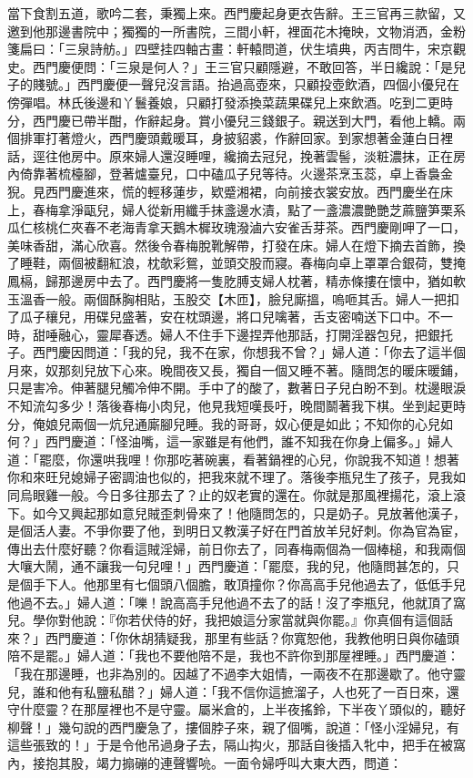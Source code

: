 當下食割五道，歌吟二套，秉獨上來。西門慶起身更衣告辭。王三官再三款留，又邀到他那邊書院中；獨獨的一所書院，三間小軒，裡面花木掩映，文物消洒，金粉箋扁曰：「三泉詩舫。」四壁挂四軸古畫：軒轅問道，伏生墳典，丙吉問牛，宋京觀史。西門慶便問：「三泉是何人？」王三官只顧隱避，不敢回答，半日纔說：「是兒子的賤號。」西門慶便一聲兒沒言語。抬過高壺來，只顧投壺飲酒，四個小優兒在傍彈唱。林氏後邊和丫鬟養娘，只顧打發添換菜蔬果碟兒上來飲酒。吃到二更時分，西門慶已帶半酣，作辭起身。賞小優兒三錢銀子。親送到大門，看他上轎。兩個排軍打著燈火，西門慶頭戴暖耳，身披貂裘，作辭回家。到家想著金蓮白日裡話，逕往他房中。原來婦人還沒睡哩，纔摘去冠兒，挽著雲髻，淡粧濃抹，正在房內倚靠著梳檯腳，登著爐臺兒，口中磕瓜子兒等待。火邊茶烹玉蕊，卓上香裊金猊。見西門慶進來，慌的輕移蓮步，欵蹙湘裙，向前接衣裳安放。西門慶坐在床上，春梅拿淨甌兒，婦人從新用纖手抹盞邊水漬，點了一盞濃濃艷艷芝蔴鹽笋栗系瓜仁核桃仁夾春不老海青拿天鵝木樨玫瑰潑滷六安雀舌芽茶。西門慶剛呷了一口，美味香甜，滿心欣喜。然後令春梅脫靴解帶，打發在床。婦人在燈下摘去首飾，換了睡鞋，兩個被翻紅浪，枕欹彩鴛，並頭交股而寢。春梅向卓上罩罩合銀荷，雙掩鳳槅，歸那邊房中去了。西門慶將一隻肐膊支婦人枕著，精赤條摟在懷中，猶如軟玉溫香一般。兩個酥胸相貼，玉股交【木匝】，臉兒廝搵，嗚咂其舌。婦人一把扣了瓜子穰兒，用碟兒盛著，安在枕頭邊，將口兒噙著，舌支密喃送下口中。不一時，甜唾融心，靈犀春透。婦人不住手下邊捏弄他那話，打開淫器包兒，把銀托子。西門慶因問道：「我的兒，我不在家，你想我不曾？」婦人道：「你去了這半個月來，奴那刻兒放下心來。晚間夜又長，獨自一個又睡不著。隨問怎的暖床暖鋪，只是害冷。伸著腿兒觸冷伸不開。手中了的酸了，數著日子兒白盼不到。枕邊眼淚不知流勾多少！落後春梅小肉兒，他見我短嘆長吁，晚間鬬著我下棋。坐到起更時分，俺娘兒兩個一炕兒通廝腳兒睡。我的哥哥，奴心便是如此；不知你的心兒如何？」西門慶道：「怪油嘴，這一家雖是有他們，誰不知我在你身上偏多。」婦人道：「罷麼，你還哄我哩！你那吃著碗裏，看著鍋裡的心兒，你說我不知道！想著你和來旺兒媳婦子密調油也似的，把我來就不理了。落後李瓶兒生了孩子，見我如同烏眼雞一般。今日多往那去了？止的奴老實的還在。你就是那風裡揚花，滾上滾下。如今又興起那如意兒賊歪刺骨來了！他隨問怎的，只是奶子。見放著他漢子，是個活人妻。不爭你要了他，到明日又教漢子好在門首放羊兒好刺。你為官為宦，傳出去什麼好聽？你看這賊淫婦，前日你去了，同春梅兩個為一個棒槌，和我兩個大嚷大鬧，通不讓我一句兒哩！」西門慶道：「罷麼，我的兒，他隨問甚怎的，只是個手下人。他那里有七個頭八個膽，敢頂撞你？你高高手兒他過去了，低低手兒他過不去。」婦人道：「嚛！說高高手兒他過不去了的話！沒了李瓶兒，他就頂了窩兒。學你對他說：『你若伏侍的好，我把娘這分家當就與你罷。』你真個有這個話來？」西門慶道：「你休胡猜疑我，那里有些話？你寬恕他，我教他明日與你磕頭陪不是罷。」婦人道：「我也不要他陪不是，我也不許你到那屋裡睡。」西門慶道：「我在那邊睡，也非為別的。因越了不過李大姐情，一兩夜不在那邊歇了。他守靈兒，誰和他有私鹽私醋？」婦人道：「我不信你這摭溜子，人也死了一百日來，還守什麼靈？在那屋裡也不是守靈。屬米倉的，上半夜搖鈴，下半夜丫頭似的，聽好柳聲！」幾句說的西門慶急了，摟個脖子來，親了個嘴，說道：「怪小淫婦兒，有這些張致的！」于是令他吊過身子去，隔山抅火，那話自後插入牝中，把手在被窩內，接抱其股，竭力搧磞的連聲響喨。一面令婦呼叫大東大西，問道：